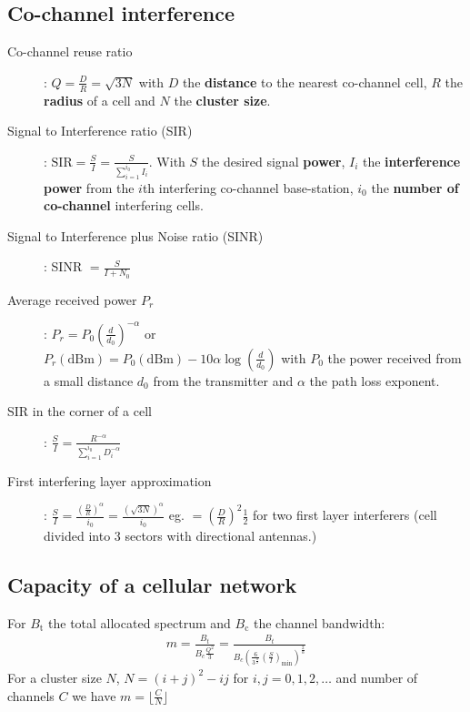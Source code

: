 \documentclass[10pt, a4paper,twocolumn]{scrartcl}
\begin{document}
\subsection{Co-channel interference}
\begin{description}
\item[Co-channel reuse ratio]: $Q = \frac{D}{R} = \sqrt{3N}$ with $D$ the \textbf{distance} to the nearest co-channel cell, $R$ the \textbf{radius} of a cell and $N$ the \textbf{cluster size}.

\item[Signal to Interference ratio (SIR)]: $\textrm{SIR} = \frac{S}{I} = \frac{S}{\sum^{i_0}_{i=1}I_i}$. With $S$ the desired signal \textbf{power}, $I_i$ the \textbf{interference power} from the $i$th interfering co-channel base-station, $i_0$ the \textbf{number of co-channel} interfering cells.

\item[Signal to Interference plus Noise ratio (SINR)] : SINR $= \frac{S}{I + N_0}$

\item[Average received power $P_r$]: $P_r = P_0(\frac{d}{d_0})^{-\alpha}$ or \\ 
$P_r(\textrm{dBm}) = P_0(\textrm{dBm})-10\alpha\log(\frac{d}{d_0})$ with $P_0$ the power received from a small distance $d_0$ from the transmitter and $\alpha$ the path loss exponent.
	
\item[SIR in the corner of a cell]: $\frac{S}{I} = \frac{R^{-\alpha}}{\sum^{i_0}_{i=1}D_i^{-\alpha}}$

\item[First interfering layer approximation]: $\frac{S}{I} = \frac{(\frac{D}{R})^\alpha}{i_0} = \frac{(\sqrt{3N})^\alpha}{i_0}$ eg. $=(\frac{D}{R})^2\frac{1}{2}$ for two first layer interferers (cell divided into 3 sectors with directional antennas.)

\end{description}

\subsection{Capacity of a cellular network}
For $B_\textrm{t}$ the total allocated spectrum and $B_\textrm{c}$ the channel bandwidth: 
\begin{align*}
m = \frac{B_t}{B_c \frac{Q^2}{3}} = \frac{B_t}{B_c\left(\frac{6}{3^{\frac{\alpha}{2}}}\left(\frac{S}{I}\right)_\textrm{min}\right)^{\frac{2}{\alpha}}}
\end{align*}
For a cluster size $N$, $N = (i + j)^2 - ij$ for $i,j=0,1,2,\ldots$ and number of channels $C$ we have $m=\lfloor\frac CN\rfloor$
\end{document}
